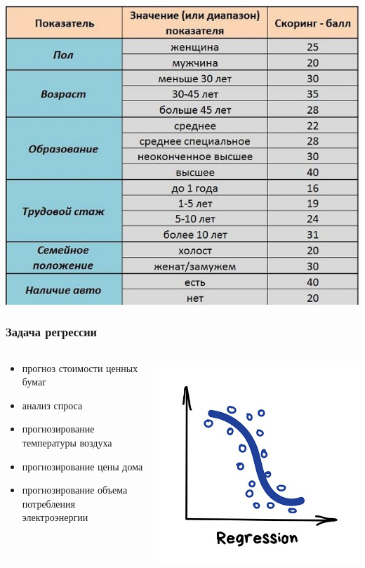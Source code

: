 \documentclass[aspectratio=169,newPxFont]{beamer}
\begin{document}
\begin{frame}{}
\centering \includegraphics[width=0.7\linewidth]{credit_score_table.jpg}\\
\end{frame}

\begin{frame}
	\frametitle{Задача регрессии}
	\begin{columns}
		\begin{column}{.66\linewidth}
			\begin{itemize}
				\item прогноз стоимости ценных бумаг
				\item анализ спроса
				\item прогнозирование температуры воздуха
				\item прогнозирование цены дома
				\item прогнозирование объема потребления электроэнергии
			\end{itemize}
		\end{column}
		\begin{column}{.4\linewidth}
			\hfill \includegraphics[width=0.9\linewidth]{regr.jpg}
		\end{column}
	\end{columns}
\end{frame}
\end{document}
